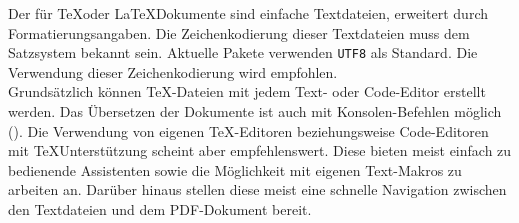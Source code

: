 \renewcommand*{\authorOfNextLines}{Helmut Quinz}
Der  für \TeX oder \LaTeX Dokumente sind einfache Textdateien, erweitert durch Formatierungsangaben.
Die Zeichenkodierung dieser Textdateien muss dem Satzsystem bekannt sein.
Aktuelle Pakete verwenden \texttt{UTF8} als Standard.
Die Verwendung dieser Zeichenkodierung wird empfohlen.\\

Grundsätzlich können \TeX -Dateien mit jedem Text- oder Code-Editor erstellt werden.
Das Übersetzen der Dokumente ist auch mit Konsolen-Befehlen möglich ().
Die Verwendung von eigenen \TeX -Editoren beziehungsweise Code-Editoren mit \TeX Unterstützung scheint aber empfehlenswert. 
Diese bieten meist einfach zu bedienende Assistenten sowie die Möglichkeit mit eigenen Text-Makros zu arbeiten an.
Darüber hinaus stellen diese meist eine schnelle Navigation zwischen den Textdateien und dem PDF-Dokument bereit.